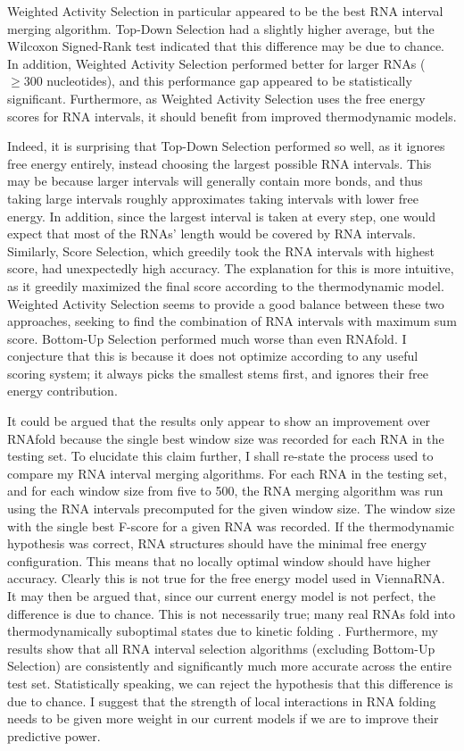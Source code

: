 \documentclass{cshonours}
\begin{document}
Weighted Activity Selection in particular appeared to be the best RNA interval merging algorithm. Top-Down Selection had a slightly higher average, but the Wilcoxon Signed-Rank test indicated that this difference may be due to chance. In addition, Weighted Activity Selection performed better for larger RNAs ($\geq 300$ nucleotides), and this performance gap appeared to be statistically significant. Furthermore, as Weighted Activity Selection uses the free energy scores for RNA intervals, it should benefit from improved thermodynamic models.

Indeed, it is surprising that Top-Down Selection performed so well, as it ignores free energy entirely, instead choosing the largest possible RNA intervals. This may be because larger intervals will generally contain more bonds, and thus taking large intervals roughly approximates taking intervals with lower free energy. In addition, since the largest interval is taken at every step, one would expect that most of the RNAs' length would be covered by RNA intervals. Similarly, Score Selection, which greedily took the RNA intervals with highest score, had unexpectedly high accuracy. The explanation for this is more intuitive, as it greedily maximized the final score according to the thermodynamic model. Weighted Activity Selection seems to provide a good balance between these two approaches, seeking to find the combination of RNA intervals with maximum sum score. Bottom-Up Selection performed much worse than even RNAfold. I conjecture that this is because it does not optimize according to any useful scoring system; it always picks the smallest stems first, and ignores their free energy contribution.

It could be argued that the results only appear to show an improvement over RNAfold because the single best window size was recorded for each RNA in the testing set. To elucidate this claim further, I shall re-state the process used to compare my RNA interval merging algorithms. For each RNA in the testing set, and for each window size from five to 500, the RNA merging algorithm was run using the RNA intervals precomputed for the given window size. The window size with the single best F-score for a given RNA was recorded. If the thermodynamic hypothesis was correct, RNA structures should have the minimal free energy configuration. This means that no locally optimal window should have higher accuracy. Clearly this is not true for the free energy model used in ViennaRNA. It may then be argued that, since our current energy model is not perfect, the difference is due to chance. This is not necessarily true; many real RNAs fold into thermodynamically suboptimal states due to kinetic folding \cite{ditzler2008rugged, treiber2001beyond}. Furthermore, my results show that all RNA interval selection algorithms (excluding Bottom-Up Selection) are consistently and significantly much more accurate across the entire test set. Statistically speaking, we can reject the hypothesis that this difference is due to chance. I suggest that the strength of local interactions in RNA folding needs to be given more weight in our current models if we are to improve their predictive power.
\end{document}
